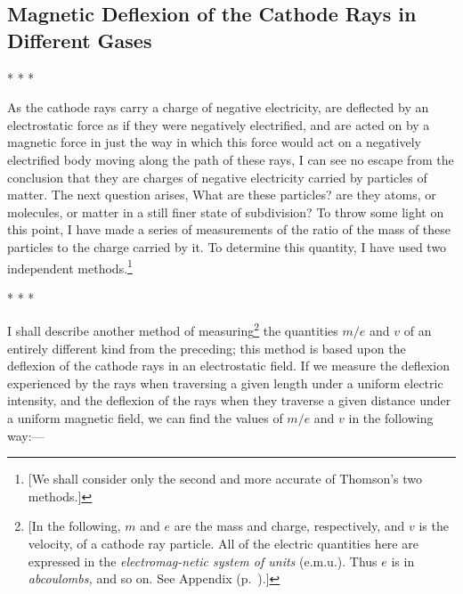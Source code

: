 \subsection*{Magnetic Deflexion of the Cathode Rays in Different Gases}
%
\centerline{* * *}

As the cathode rays carry a charge of negative electricity, are
deflected by an electrostatic force as if they were negatively
electrified, and are acted on by a magnetic force in just the way in
which this force would act on a negatively electrified body moving along
the path of these rays, I can see no escape from the conclusion that
they are charges of negative electricity carried by particles of matter.
The next question arises, What are these particles? are they atoms, or
molecules, or matter in a still finer state of subdivision? To throw
some light on this point, I have made a series of measurements of the
ratio of the mass of these particles to the charge carried by it. To
determine this quantity, I have used two independent methods.\footnote{{[}We
  shall consider only the second and more accurate of Thomson's two
  methods.{]}}\\
\centerline{* * *}

I shall describe another method of measuring\footnote{{[}In the
  following, $m$ and $e$ are the mass and charge,
  respectively, and $v$ is the velocity, of a cathode ray particle.
  All of the electric quantities here are expressed in the
  \emph{electromag-netic system of units} (e.m.u.). Thus $e$ is in
  \emph{abcoulombs,} and so on. See Appendix (p.~\pageref{ch:appendix}).{]}} the
quantities $m/e$ and $v$ of an entirely different kind from
the preceding; this method is based upon the deflexion of the cathode
rays in an electrostatic field. If we measure the deflexion experienced
by the rays when traversing a given length under a uniform electric
intensity, and the deflexion of the rays when they traverse a given
distance under a uniform magnetic field, we can find the values of
$m/e$ and $v$ in the following way:---

